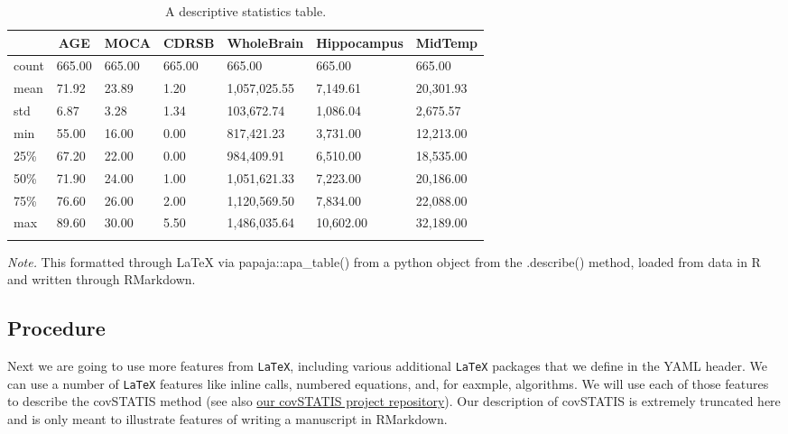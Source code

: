 \documentclass[man,floatsintext]{apa6}
\theoremstyle{definition}
\theoremstyle{definition}
\theoremstyle{definition}
\theoremstyle{remark}
\begin{document}
\begin{table}[tbp]
\begin{center}
\begin{threeparttable}
\caption{\label{tab:python_describe_via_kable}A descriptive statistics table.}
\begin{tabular}{lllllll}
\toprule
 & \multicolumn{1}{c}{AGE} & \multicolumn{1}{c}{MOCA} & \multicolumn{1}{c}{CDRSB} & \multicolumn{1}{c}{WholeBrain} & \multicolumn{1}{c}{Hippocampus} & \multicolumn{1}{c}{MidTemp}\\
\midrule
count & 665.00 & 665.00 & 665.00 & 665.00 & 665.00 & 665.00\\
mean & 71.92 & 23.89 & 1.20 & 1,057,025.55 & 7,149.61 & 20,301.93\\
std & 6.87 & 3.28 & 1.34 & 103,672.74 & 1,086.04 & 2,675.57\\
min & 55.00 & 16.00 & 0.00 & 817,421.23 & 3,731.00 & 12,213.00\\
25\% & 67.20 & 22.00 & 0.00 & 984,409.91 & 6,510.00 & 18,535.00\\
50\% & 71.90 & 24.00 & 1.00 & 1,051,621.33 & 7,223.00 & 20,186.00\\
75\% & 76.60 & 26.00 & 2.00 & 1,120,569.50 & 7,834.00 & 22,088.00\\
max & 89.60 & 30.00 & 5.50 & 1,486,035.64 & 10,602.00 & 32,189.00\\
\bottomrule
\addlinespace
\end{tabular}
\begin{tablenotes}[para]
\normalsize{\textit{Note.} This formatted through LaTeX via papaja::apa\_table() from a python object from the .describe() method, loaded from data in R and written through RMarkdown.}
\end{tablenotes}
\end{threeparttable}
\end{center}
\end{table}

\hypertarget{procedure}{%
\subsection{Procedure}\label{procedure}}

Next we are going to use more features from \texttt{LaTeX}, including
various additional \texttt{LaTeX} packages that we define in the YAML
header. We can use a number of \texttt{LaTeX} features like inline
calls, numbered equations, and, for eaxmple, algorithms. We will use
each of those features to describe the covSTATIS method (see also
\href{https://github.com/jennyrieck/C-MARINeR}{our covSTATIS project
repository}). Our description of covSTATIS is extremely truncated here
and is only meant to illustrate features of writing a manuscript in
RMarkdown.
\end{document}
